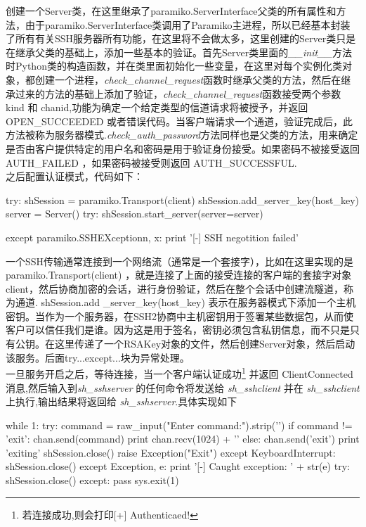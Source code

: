 \documentclass[UTF8,a4paper,cs4size]{ctexart}
\begin{document}
\indent 创建一个Server类，在这里继承了paramiko.ServerInterface父类的所有属性和方法，由于paramiko.ServerInterface类调用了Paramiko主进程，所以已经基本封装了所有有关SSH服务器所有功能，在这里将不会做太多，这里创建的Server类只是在继承父类的基础上，添加一些基本的验证。首先Server类里面的\textit{\_\_init\_\_}方法时Python类的构造函数，并在类里面初始化一些变量，在这里对每个实例化类对象，都创建一个进程，\textit{check\_channel\_request}函数时继承父类的方法，然后在继承过来的方法的基础上添加了验证，\textit{check\_channel\_request}函数接受两个参数 kind 和 chanid,功能为确定一个给定类型的信道请求将被授予，并返回OPEN\_SUCCEEDED 或者错误代码。当客户端请求一个通道，验证完成后，此方法被称为服务器模式.\textit{check\_auth\_password}方法同样也是父类的方法，用来确定是否由客户提供特定的用户名和密码是用于验证身份​​接受。如果密码不被接受返回AUTH\_FAILED ，如果密码被接受则返回 AUTH\_SUCCESSFUL.\\
\indent 之后配置认证模式，代码如下：
\begin{python}
try:
	shSession = paramiko.Transport(client)
	shSession.add_server_key(host_key)
	server = Server()
	try:
			shSession.start_server(server=server)
			
	except paramiko.SSHEXceptionn, x:
		print '[-] SSH negotition failed'
\end{python}

\indent 一个SSH传输通常连接到一个网络流（通常是一个套接字），比如在这里实现的是 paramiko.Transport(client) ，就是连接了上面的接受连接的客户端的套接字对象client，然后协商加密的会话，进行身份验证，然后在整个会话中创建流隧道，称为通道. shSession.add \_server\_key(host\_key) 表示在服务器模式下添加一个主机密钥。当作为一个服务器，在SSH2协商中主机密钥用于签署某些数据包，从而使客户可以信任我们是谁。因为这是用于签名，密钥必须包含私钥信息，而不只是只有公钥。在这里传递了一个RSAKey对象的文件，然后创建Server对象，然后启动该服务。后面try...except...块为异常处理。\\
\indent 一旦服务开启之后，等待连接，当一个客户端认证成功\footnote{若连接成功,则会打印[+] Authenticaed!}  并返回 ClientConnected 消息,然后输入到\textit{sh\_sshserver} 的任何命令将发送给\textit{ sh\_sshclient} 并在 \textit{sh\_sshclient} 上执行,输出结果将返回给\textit{ sh\_sshserver}.具体实现如下
\begin{python}
while 1:
	try:
		command = raw_input("Enter command:").strip('\n')
		if command != 'exit':
			chan.send(command)
			print chan.recv(1024) + '\n'
		else:
			chan.send('exit')
			print 'exiting'
			shSession.close()
			raise Exception("Exit")
		except KeyboardInterrupt:
			shSession.close()
	except Exception, e:
		print '[-] Caught exception: ' + str(e)
		try:
			shSession.close()
		except:
			pass
		sys.exit(1)
\end{python}
\end{document}
